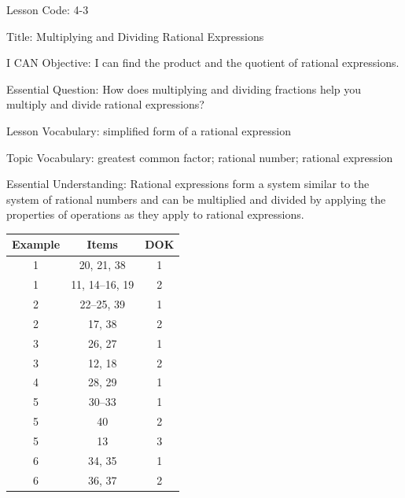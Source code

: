 \documentclass{article}
\newenvironment{lesson-meta}{}{}        %
\newenvironment{item-analysis}{}{}      %
\begin{document}
\begin{lesson-meta}
Lesson Code: 4-3

Title: Multiplying and Dividing Rational Expressions

I CAN Objective: I can find the product and the quotient of rational expressions.

Essential Question: How does multiplying and dividing fractions help you multiply and divide rational expressions?

Lesson Vocabulary: simplified form of a rational expression

Topic Vocabulary: greatest common factor; rational number; rational expression

Essential Understanding: Rational expressions form a system similar to the system of rational numbers and can be multiplied and divided by applying the properties of operations as they apply to rational expressions.
\end{lesson-meta}

\begin{item-analysis}
\begin{tabular}{ccc}
\hline
Example & Items & DOK \\
\hline
1 & 20, 21, 38 & 1 \\
1 & 11, 14--16, 19 & 2 \\
2 & 22--25, 39 & 1 \\
2 & 17, 38 & 2 \\
3 & 26, 27 & 1 \\
3 & 12, 18 & 2 \\
4 & 28, 29 & 1 \\
5 & 30--33 & 1 \\
5 & 40 & 2 \\
5 & 13 & 3 \\
6 & 34, 35 & 1 \\
6 & 36, 37 & 2 \\
\hline
\end{tabular}
\end{item-analysis}
\end{document}
